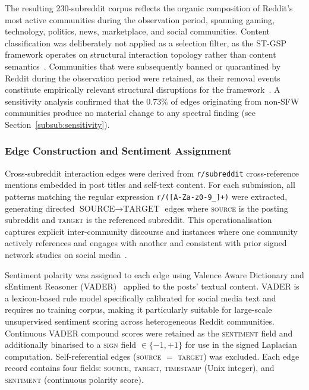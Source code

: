 \documentclass[a4paper,fleqn]{cas-dc}
\begin{document}
The resulting 230-subreddit corpus reflects the organic composition of
Reddit's most active communities during the observation period,
spanning gaming, technology, politics, news, marketplace, and social
communities. Content classification was deliberately not applied as a
selection filter, as the ST-GSP framework operates on structural
interaction topology rather than content semantics~\cite{18_Ortega2018}.
Communities that were subsequently banned or quarantined by Reddit
during the observation period were retained, as their removal events
constitute empirically relevant structural disruptions for the
framework~\cite{7_Goglia2024}. A sensitivity analysis confirmed that
the 0.73\% of edges originating from non-SFW communities produce no
material change to any spectral finding (see
Section~\ref{subsub:sensitivity}).

\subsubsection{Edge Construction and Sentiment Assignment}
\label{subsub:edges}

Cross-subreddit interaction edges were derived from \texttt{r/subreddit}
cross-reference mentions embedded in post titles and self-text content.
For each submission, all patterns matching the regular expression
\texttt{r/([A-Za-z0-9\_]+)} were extracted, generating directed
$\text{SOURCE} \rightarrow \text{TARGET}$ edges where
\textsc{source} is the posting subreddit and \textsc{target} is the
referenced subreddit. This operationalisation captures explicit
inter-community discourse and instances where one community actively
references and engages with another and consistent with prior signed
network studies on social media~\cite{21_Leskovec2010,22_Tang2016}.

Sentiment polarity was assigned to each edge using Valence Aware Dictionary and sEntiment Reasoner (VADER)~\cite{19_Hutto2014} applied to the
posts’ textual content. VADER is a lexicon-based rule model specifically
calibrated for social media text and requires no training corpus,
making it particularly suitable for large-scale unsupervised sentiment
scoring across heterogeneous Reddit communities. Continuous VADER
compound scores were retained as the \textsc{sentiment} field and
additionally binarised to a \textsc{sign} field $\in \{-1, +1\}$ for
use in the signed Laplacian computation. Self-referential edges
(\textsc{source} $=$ \textsc{target}) was excluded. Each edge record
contains four fields: \textsc{source}, \textsc{target},
\textsc{timestamp} (Unix integer), and \textsc{sentiment} (continuous
polarity score).
\end{document}

